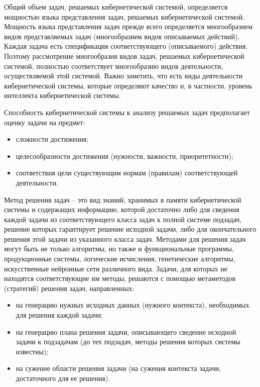 Общий объем задач, решаемых кибернетической системой, определяется мощностью языка представления задач, решаемых кибернетической системой.
Мощность языка представления задач прежде всего определяется многообразием видов представляемых задач (многообразием видов описываемых действий). 
Каждая задача есть спецификация соответствующего (описываемого) действия. 
Поэтому рассмотрение многообразия видов задач, решаемых кибернетической системой, полностью соответствует многообразию видов деятельности, осуществляемой этой системой. 
Важно заметить, что есть виды деятельности кибернетической системы, которые определяют качество и, в частности, уровень интеллекта кибернетической системы.

Способность кибернетической системы к анализу решаемых задач предполагает оценку задачи на предмет:
\begin{itemize}
    \item{сложности достижения;}
    \item{целесообразности достижения (нужности, важности, приоритетности);}
    \item{соответствия цели существующим нормам (правилам) соответствующей деятельности.}
\end{itemize}


Метод решения задач – это вид знаний, хранимых в памяти кибернетической системы и содержащих информацию, которой достаточно либо для сведения каждой задачи из соответствующего класса задач к полной системе подзадач, решение которых гарантирует решение исходной задачи, либо для окончательного решения этой задачи из указанного класса задач. 
Методами для решения задач могут быть не только алгоритмы, но также и функциональные программы, продукционные системы, логические исчисления, генетические алгоритмы, искусственные нейронные сети различного вида.
Задачи, для которых не находятся соответствующие им методы, решаются с помощью метаметодов (стратегий) решения задач, направленных:
\begin{itemize}
    \item{на генерацию нужных исходных данных (нужного контекста), необходимых для решения каждой задачи;}
    \item{на генерацию плана решения задачи, описывающего сведение исходной задачи к подзадачам (до тех подзадач, методы решения которых системы известны);}
    \item{на сужение области решения задачи (на сужения контекста задачи, достаточного для ее решения).}
\end{itemize}

